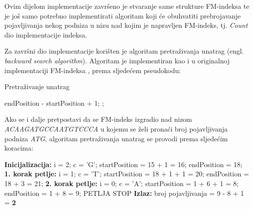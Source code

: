 Ovim dijelom implementacije završeno je stvaranje same strukture FM-indeksa te je još samo potrebno implementirati algoritam koji će obuhvatiti prebrojavanje pojavljivanja nekog podniza u nizu nad kojim je napravljen FM-indeks, tj. \emph{Count} dio implementacije indeksa.

Za završni dio implementacije korišten je algoritam pretraživanja unatrag (engl. \emph{backward search algorithm}). Algoritam je implementiran kao i u originalnoj implementaciji FM-indeksa \cite{fm1}, prema sljedećem pseudokodu:


\begin{algorithm}
\caption{ Pretraživanje unatrag }
\label{algo:bws}
\begin{algorithmic}
\ENDFOR
{}
\RETURN endPosition - startPosition + 1;
\ELSE
{};
\ENDIF
\end{algorithmic}
\end{algorithm}


\vspace{3 mm}

Ako se i dalje pretpostavi da se FM-indeks izgradio nad nizom \emph{ACAAGATGCCAATGTCCCA}  u kojemu se želi pronaći broj pojavljivanja podniza \emph{ATG}, algoritam pretraživanja unatrag se provodi prema sljedećim koracima:

\vspace{2 mm}

\textbf{Inicijalizacija:} \newline
i = 2; \newline
c = 'G'; \newline
startPosition = 15 + 1 = 16; \newline
endPosition = 18; \newline
\newline
\textbf{1. korak petlje:} \newline
i = 1; \newline
c = 'T'; \newline
startPosition  = 18 + 1 + 1 = 20; \newline
endPosition = 18 + 3 = 21; \newline
\newline
\textbf{2. korak petlje:} \newline
i = 0; \newline
c = 'A'; \newline
startPosition  = 1 + 6 + 1 = 8; \newline
endPosition = 1 + 8 = 9; \newline
PETLJA STOP \newline
 \newline
\textbf{Izlaz:} broj pojavljivanja = 9 - 8 + 1 = \textbf{2} 


